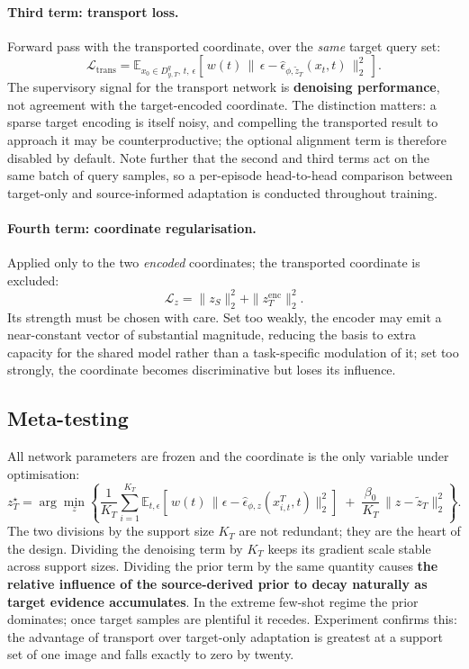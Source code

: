 \documentclass[11pt]{article}
\newcommand{\epshat}{\hat{\epsilon}}
\newcommand{\zS}{z_{S}}
\newcommand{\zencT}{z^{\mathrm{enc}}_{T}}
\newcommand{\ztilT}{\tilde{z}_{T}}
\newcommand{\zstarT}{z^{\star}_{T}}
\newcommand{\Dqt}{D^{q}_{y,T}}
\begin{document}
\paragraph{Third term: transport loss.} Forward pass with the transported coordinate, over the
\emph{same} target query set:
\begin{equation}
\mathcal{L}_{\mathrm{trans}}
= \mathbb{E}_{x_0\in\Dqt,\,t,\,\epsilon}
  \left[\, w(t)\,\bigl\|\,\epsilon-\epshat_{\phi,\ztilT}(x_t,t)\,\bigr\|_2^2 \,\right].
\end{equation}
The supervisory signal for the transport network is \textbf{denoising performance}, not agreement
with the target-encoded coordinate. The distinction matters: a sparse target encoding is itself
noisy, and compelling the transported result to approach it may be counterproductive; the optional
alignment term is therefore disabled by default. Note further that the second and third terms act on
the same batch of query samples, so a per-episode head-to-head comparison between target-only and
source-informed adaptation is conducted throughout training.

\paragraph{Fourth term: coordinate regularisation.} Applied only to the two \emph{encoded}
coordinates; the transported coordinate is excluded:
\begin{equation}
\mathcal{L}_{z} = \|\zS\|_2^2 + \|\zencT\|_2^2 .
\end{equation}
Its strength must be chosen with care. Set too weakly, the encoder may emit a near-constant vector
of substantial magnitude, reducing the basis to extra capacity for the shared model rather than a
task-specific modulation of it; set too strongly, the coordinate becomes discriminative but loses
its influence.

\subsection{Meta-testing}

All network parameters are frozen and the coordinate is the only variable under optimisation:
\begin{equation}
\zstarT=\arg\min_{z}\left\{
\frac{1}{K_T}\sum_{i=1}^{K_T}
\mathbb{E}_{t,\epsilon}\!\left[\,w(t)\,\bigl\|\epsilon-\epshat_{\phi,z}(x^{T}_{i,t},t)\bigr\|_2^2\right]
\;+\;\frac{\beta_0}{K_T}\,\bigl\|z-\ztilT\bigr\|_2^2
\right\}.
\label{eq:refine}
\end{equation}
The two divisions by the support size $K_T$ are not redundant; they are the heart of the design.
Dividing the denoising term by $K_T$ keeps its gradient scale stable across support sizes. Dividing
the prior term by the same quantity causes \textbf{the relative influence of the source-derived
prior to decay naturally as target evidence accumulates}. In the extreme few-shot regime the prior
dominates; once target samples are plentiful it recedes. Experiment confirms this: the advantage of
transport over target-only adaptation is greatest at a support set of one image and falls exactly to
zero by twenty.
\end{document}
